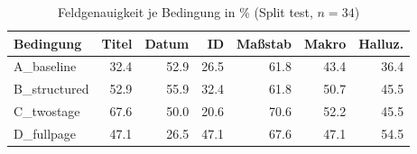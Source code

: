 \begin{table}[htb]
\centering
\caption{Feldgenauigkeit je Bedingung in \% (Split test, $n=34$)}
\label{tab:results}
\begin{tabular}{lrrrrrr}
\toprule
Bedingung & Titel & Datum & ID & Maßstab & Makro & Halluz. \\
\midrule
A\_baseline & 32.4 & 52.9 & 26.5 & 61.8 & 43.4 & 36.4 \\
B\_structured & 52.9 & 55.9 & 32.4 & 61.8 & 50.7 & 45.5 \\
C\_twostage & 67.6 & 50.0 & 20.6 & 70.6 & 52.2 & 45.5 \\
D\_fullpage & 47.1 & 26.5 & 47.1 & 67.6 & 47.1 & 54.5 \\
\bottomrule
\end{tabular}
\end{table}
